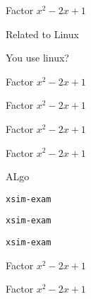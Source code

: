 \documentclass{article}
\begin{document}
\newpage
\stop





\begin{enumext}[save-ans=simplews,columns=1,check-ans=true,show-pos,nosep,save-ref]
  \item Factor $x^{2}-2x+1$ 
  \item Related to Linux
    \begin{enumext}[nosep,columns*=2]
      \item You use linux? 
      \item Factor $x^{2}-2x+1$ 
      \item Factor $x^{2}-2x+1$ 
    \end{enumext}
   \item Factor $x^{2}-2x+1$ 
   \item Factor $x^{2}-2x+1$ 
   \item ALgo
      \begin{enumext*}[nosep]
         \item* \texttt{xsim-exam} 
         \item* \texttt{xsim-exam} 
         \item* \texttt{xsim-exam} 
      \end{enumext*}
   \item Factor $x^{2}-2x+1$ 
   \item Factor $x^{2}-2x+1$ 
\end{enumext}

\stop
\end{document}
